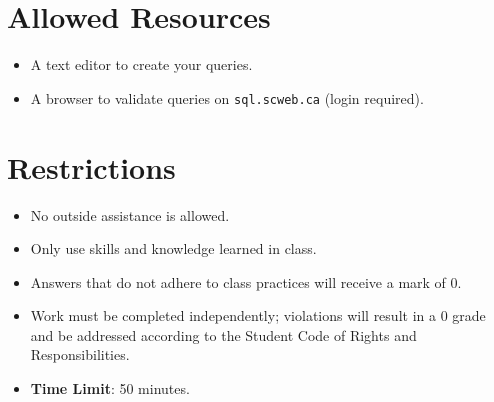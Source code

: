 \documentclass{article}
\begin{document}
\section*{Allowed Resources}
\begin{itemize}
    \item A text editor to create your queries.
    \item A browser to validate queries on \texttt{sql.scweb.ca} (login required).
\end{itemize}

\section*{Restrictions}
\begin{itemize}
    \item No outside assistance is allowed.
    \item Only use skills and knowledge learned in class.
    \item Answers that do not adhere to class practices will receive a mark of 0.
    \item Work must be completed independently; violations will result in a 0 grade and be addressed according to the Student Code of Rights and Responsibilities.
    \item \textbf{Time Limit}: 50 minutes.
\end{itemize}
\end{document}

